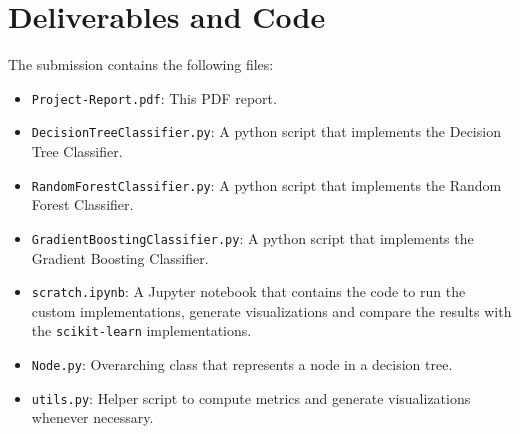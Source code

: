 \graphicspath{{Images/}}

\section{Deliverables and Code}

The submission contains the following files:
\begin{itemize}
    \item \texttt{Project-Report.pdf}: This PDF report.
    \item \texttt{DecisionTreeClassifier.py}: A python script that implements the Decision Tree Classifier.
    \item \texttt{RandomForestClassifier.py}: A python script that implements the Random Forest Classifier.
    \item \texttt{GradientBoostingClassifier.py}: A python script that implements the Gradient Boosting Classifier.
    \item \texttt{scratch.ipynb}: A Jupyter notebook that contains the code to run the custom implementations, generate visualizations and compare the results with the \texttt{scikit-learn} implementations.
    \item \texttt{Node.py}: Overarching class that represents a node in a decision tree.
    \item \texttt{utils.py}: Helper script to compute metrics and generate visualizations whenever necessary.
\end{itemize}



